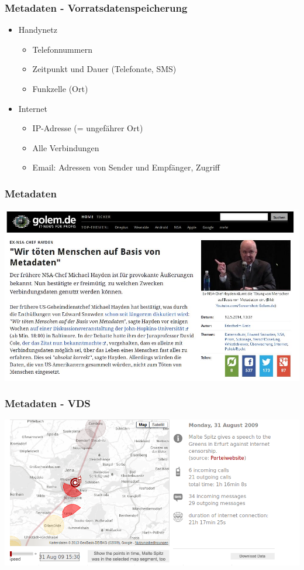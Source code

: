 \documentclass[12pt, xcolor={svgnames,table}]{beamer}
\begin{document}
\begin{frame}
  \frametitle{Metadaten - Vorratsdatenspeicherung}
  \begin{itemize}
    \item Handynetz
      \begin{itemize}
        \item Telefonnummern
        \item Zeitpunkt und Dauer (Telefonate, SMS)
        \item Funkzelle (Ort)
      \end{itemize}
    \item Internet
      \begin{itemize}
        \item IP-Adresse (= ungefährer Ort)
        \item Alle Verbindungen
        \item Email: Adressen von Sender und Empfänger, Zugriff
      \end{itemize}
  \end{itemize}
\end{frame}

\begin{frame}
    \frametitle{Metadaten}
    \begin{center}
      \includegraphics[height=0.7\textheight]{img/wekillpeople.jpg}
    \end{center}
\end{frame}

\begin{frame}
    \frametitle{Metadaten - VDS}
    \includegraphics[height=0.7\textheight]{img/maltespitz.png}
\end{frame}
\end{document}
